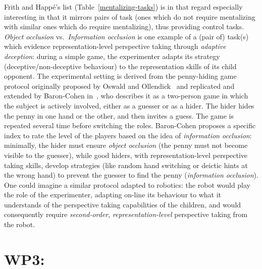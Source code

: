 \documentclass[11pt,a4paper]{report}
\begin{document}
Frith and Happé's list (Table~\ref{mentalizing-tasks}) is in that regard
especially interesting in that it mirrors pairs of task (ones which do not
require mentalizing with similar ones which do require mentalizing), thus
providing control tasks.  \emph{Object occlusion} vs.~\emph{Information
occlusion} is one example of a (pair of) task(s) which evidence
representation-level perspective taking through \emph{adaptive deception}:
during a simple game, the experimenter adapts its strategy
(deceptive/non-deceptive behaviour) to the representation skills of its child
opponent. The experimental setting is derived from the penny-hiding game
protocol originally proposed by Oswald and Ollendick~\cite{oswald1989role} and
replicated and extended by Baron-Cohen in~\cite{baron1992out}, who describes it
as a two-person game in which the subject is actively involved, either as a
guesser or as a hider. The hider hides the penny in one hand or the other, and
then invites a guess. The game is repeated several time before switching the
roles. Baron-Cohen proposes a specific index to rate the level of the players
based on the idea of \emph{information occlusion}: minimally, the hider must
ensure \emph{object occlusion} (the penny must not become visible to the
guesser), while good hiders, with representation-level perspective taking
skills, develop strategies (like random hand switching or deictic hints at the
wrong hand) to prevent the guesser to find the penny (\emph{information
occlusion}). One could imagine a similar protocol adapted to robotics: the robot
would play the role of the experimenter, adapting on-line its
behaviour to what it understands of the perspective taking capabilities of the
children, and would consequently require \emph{second-order},
\emph{representation-level} perspective taking from the robot.



\section{WP3: \textbf{\wpThree}} 

\noindent{}
\end{document}
